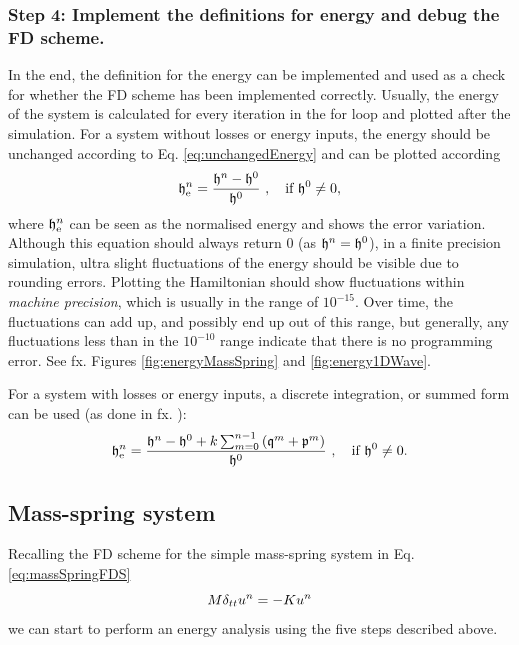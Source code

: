 {{\subsubsection{Step 4: Implement the definitions for energy and debug the FD scheme.}
In the end, the definition for the energy can be implemented and used as a check for whether the FD scheme has been implemented correctly. Usually, the energy of the system is calculated for every iteration in the for loop and plotted after the simulation.
For a system without losses or energy inputs, the energy should be unchanged according to Eq. \eqref{eq:unchangedEnergy} and can be plotted according
% 
\begin{equation}\label{eq:normalisedEnergy}
    \mathfrak{h}_{\text{e}}^n = \frac{\mathfrak{h}^n - \mathfrak{h}^0}{\mathfrak{h}^0}\ ,\quad \text{if}\  \mathfrak{h}^0\neq 0,
\end{equation}
% 
where $\mathfrak{h}^n_\text{e}$ can be seen as the normalised energy and shows the error variation. 
Although this equation should always return $0$ (as $\mathfrak{h}^n = \mathfrak{h}^0$), in a finite precision simulation, ultra slight fluctuations of the energy should be visible due to rounding errors. Plotting the Hamiltonian should show fluctuations within \textit{machine precision}, which is usually in the range of $10^{-15}$. Over time, the fluctuations can add up, and possibly end up out of this range, but generally, any fluctuations less than in the $10^{-10}$ range indicate that there is no programming error. See fx. Figures \ref{fig:energyMassSpring} and \ref{fig:energy1DWave}.

For a system with losses or energy inputs, a discrete integration, or summed form can be used (as done in fx. \cite{Harrison2018}):
\begin{equation}\label{eq:normalisedEnergyDamping}
    \h_{\text{e}}^n = \frac{\h^n-\h^0 + k\sum_{m = 0}^{n-1} \left(\mathfrak{q}^m + \mathfrak{p}^m\right)}{\h^0}\ ,\quad \text{if}\ \h^0\neq 0.
\end{equation}

\subsection{Mass-spring system}
Recalling the FD scheme for the simple mass-spring system in Eq. \eqref{eq:massSpringFDS}
\begin{equation*}
    M\delta_{tt} u^n = -Ku^n
\end{equation*}
we can start to perform an energy analysis using the five steps described above. 

}}
